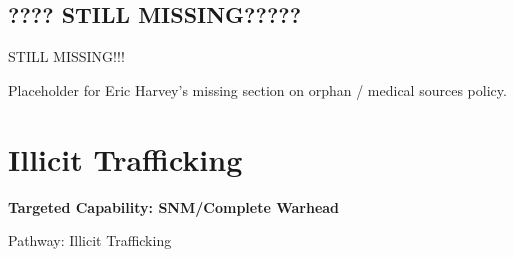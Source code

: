 \documentclass{report}
\begin{document}
\subsection{???? STILL MISSING?????}

STILL MISSING!!!

Placeholder for Eric Harvey's missing section on orphan / medical sources policy.


% 
% 








\section{Illicit Trafficking} \label{sec:Trafficking}


\bfseries Targeted Capability: SNM/Complete Warhead 

Pathway: Illicit Trafficking 
\end{document}
